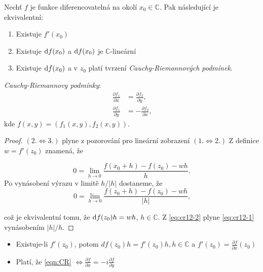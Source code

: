\begin{theorem}\label{CR}
Nechť $f$ je funkce diferencovatelná na okolí $x_0 \in \mathbb{C}$. Pak následující je ekvivalentní:
\begin{enumerate}
    \item Existuje $f'(x_0)$
    \item Existuje $\mathop{}\!\mathrm{d} f(x_0)$ a $\mathop{}\!\mathrm{d} f(x_0)$ je $ \mathbb{C}$-lineární
    \item Existuje $\mathop{}\!\mathrm{d} f(x_0)$ a v $z_0$ platí tvrzení \emph{Cauchy-Riemannových podmínek}.
\end{enumerate}

\emph{Cauchy-Riemannovy podmínky}:
\begin{align*}
\tag{CR}
\label{eqn:CR}
\frac{\partial f_1}{\partial x} &= \frac{\partial f_2}{\partial y}\text{, }\\
\frac{\partial f_1}{\partial y} &= -\frac{\partial f_2}{\partial x}\text{,}    
\end{align*}
kde $f(x,y) = (f_1(x,y),f_2(x,y))$.

\end{theorem}
\begin{proof}
$(2. \iff 3.)$ plyne z pozorování pro lineární zobrazení
\newline
$(1. \iff 2.)$ Z definice $w = f'(z_0)$ znamená, že 

\begin{equation}\label{eq:cr12-1} 
0 = \lim_{h \to 0} {\frac{f(x_0+h)-f(z_0)-wh}{h}}\text{.} 
\end{equation}
Po vynásobení výrazu v limitě $h/|h|$ dostaneme, že
\begin{equation}\label{eq:cr12-2}
0 = \lim_{h \to 0} \frac{f(z_0+h)-f(z_0)-wh}{|h|}\text{,}
\end{equation}

což je ekvivalentní tomu, že $\mathop{}\!\mathrm{d} f(z_0)h=wh$, $h\in \mathbb{C}$. Z \cref{eq:cr12-2} plyne \cref{eq:cr12-1} vynásobením $|h|/h$.
\end{proof}


\begin{note}\mbox{}
\begin{itemize}
    \item Existuje-li $f'(z_0)$, potom $df(z_0)h = f'(z_0)h, h \in \mathbb{C}$ a $f'(z_0) = \frac{\partial f}{\partial x}(z_0)$
    \item Platí, že \cref{eqn:CR}
    $\iff \frac{\partial f}{\partial x}    = -i\frac{\partial f}{\partial y}$
\end{itemize}
\end{note}


